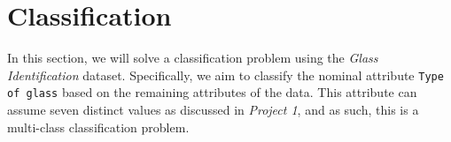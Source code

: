 \section{Classification}
In this section, we will solve a classification problem using the \textit{Glass Identification} dataset. Specifically, we aim to classify the nominal attribute \texttt{Type of glass} based on the remaining attributes of the data. This attribute can assume seven distinct values as discussed in \textit{Project 1}, and as such, this is a multi-class classification problem. 